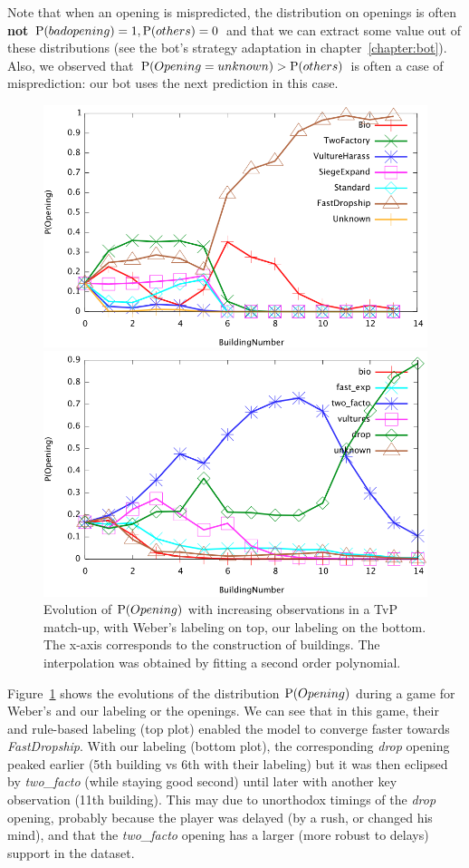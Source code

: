 Note that when an opening is mispredicted, the distribution on openings is often \textbf{not} $\mathrm{P}(badopening)=1, \mathrm{P}(others)=0$ and that we can extract some value out of these distributions (see the bot's strategy adaptation in chapter~\ref{chapter:bot}). Also, we observed that $\mathrm{P}(Opening=unknown)>\mathrm{P}(others)$ is often a case of misprediction: our bot uses the next prediction in this case. 

\begin{figure}[h]
\centerline{\includegraphics[width=0.7\columnwidth]{images/TvP_prediction.png}}
\centerline{\includegraphics[width=0.7\columnwidth]{images/TvPx_prediction.png}}
\caption{Evolution of $\mathrm{P}(Opening)$ with increasing observations in a TvP match-up, with Weber's labeling on top, our labeling on the bottom. The x-axis corresponds to the construction of buildings. The interpolation was obtained by fitting a second order polynomial.}
\label{fig:openingsprediction}
\end{figure}

Figure~\ref{fig:openingsprediction} shows the evolutions of the distribution $\mathrm{P}(Opening)$ during a game for Weber's and our labeling or the openings. We can see that in this game, their  and rule-based labeling (top plot) enabled the model to converge faster towards \textit{FastDropship}. With our labeling (bottom plot), the corresponding \textit{drop} opening peaked earlier (5th building vs 6th with their labeling) but it was then eclipsed by \textit{two\_facto} (while staying good second) until later with another key observation (11th building). This may due to unorthodox timings of the \textit{drop} opening, probably because the player was delayed (by a rush, or changed his mind), and that the \textit{two\_facto} opening has a larger (more robust to delays) support in the dataset.

